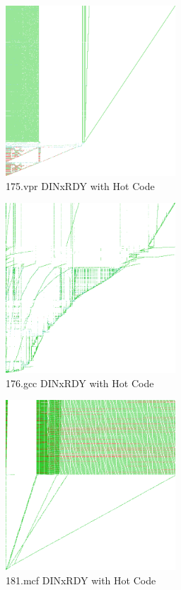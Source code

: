 \documentclass[defaultstyle,11pt]{thesis}
\begin{document}
\begin{figure}
  \centering
  \includegraphics[height=2.50in]{images/hotcode/175vprRunRef1_1000mil}
  \caption{175.vpr DINxRDY with Hot Code}
  \label{fig:175vprhot}
\end{figure}

\begin{figure}
  \centering
  \includegraphics[height=2.50in]{images/hotcode/176gccRunRef1_1000mil}
  \caption{176.gcc DINxRDY with Hot Code}
  \label{fig:176gcchot}
\end{figure}

\begin{figure}
  \centering
  \includegraphics[height=2.50in]{images/hotcode/181mcfRunRef1_1000mil}
  \caption{181.mcf DINxRDY with Hot Code}
  \label{fig:181mcfhot}
\end{figure}
\end{document}
